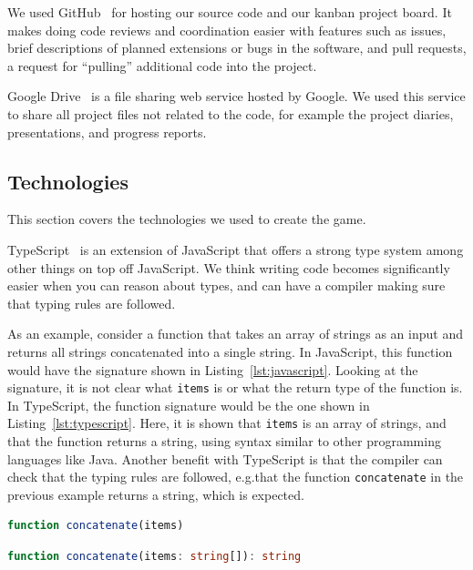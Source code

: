 \documentclass[a4paper]{article}
\begin{document}
We used GitHub~\cite{github} for hosting our source code and our kanban project board. It makes doing code reviews and coordination easier with features such as issues, brief descriptions of planned extensions or bugs in the software, and pull requests, a request for ``pulling'' additional code into the project.

Google Drive~\cite{drive} is a file sharing web service hosted by Google. We used this service to share all project files not related to the code, for example the project diaries, presentations, and progress reports.

\subsection{Technologies}\label{sec:techs}

This section covers the technologies we used to create the game.

TypeScript~\cite{typescript} is an extension of JavaScript that offers a strong type system among other things on top off JavaScript. We think writing code becomes significantly easier when you can reason about types, and can have a compiler making sure that typing rules are followed.

As an example, consider a function that takes an array of strings as an input and returns all strings concatenated into a single string. In JavaScript, this function would have the signature shown in Listing~\ref{lst:javascript}. Looking at the signature, it is not clear what \texttt{items} is or what the return type of the function is. In TypeScript, the function signature would be the one shown in Listing~\ref{lst:typescript}. Here, it is shown that \texttt{items} is an array of strings, and that the function returns a string, using syntax similar to other programming languages like Java. Another benefit with TypeScript is that the compiler can check that the typing rules are followed, e.g.\@ that the function \texttt{concatenate} in the previous example returns a string, which is expected.

\begin{lstlisting}[language=JavaScript,label=lst:javascript,numbers=none,caption={An example of a JavaScript function signature. The corresponding TypeScript signature is shown in Listing~\ref{lst:typescript}.}]
function concatenate(items)
\end{lstlisting}

\begin{lstlisting}[language=TypeScript,label=lst:typescript,numbers=none,caption={An example of a TypeScript function signature. The corresponding JavaScript signature is shown in Listing~\ref{lst:javascript}.}]
function concatenate(items: string[]): string
\end{lstlisting}
\end{document}

